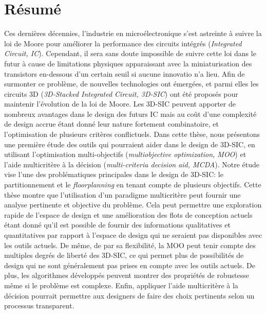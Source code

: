 \chapter[R\'esum\'e (French Summary)]{R\'esum\'e}

\vspace{-0.5in}

Ces dernières décennies, l'industrie en microélectronique s'est astreinte à suivre la loi de Moore pour améliorer la performance des circuits intégrés (\textit{Integrated Circuit, IC}). Cependant, il sera sans doute impossible de suivre cette loi dans le futur à cause de limitations physiques apparaissant avec la miniaturisation des transistors en-dessous d'un certain seuil si aucune innovatio n'a lieu. Afin de surmonter ce problème, de nouvelles technologies ont émergées, et parmi elles les circuits 3D (\textit{3D-Stacked Integrated Circuit, 3D-SIC}) ont été proposés pour maintenir l'évolution de la loi de Moore. Les 3D-SIC peuvent apporter de nombreux avantages dans le design des futurs IC mais au coût d'une complexité de design accrue étant donné leur nature fortement combinatoire, et l'optimisation de plusieurs critères conflictuels. Dans cette thèse, nous présentons une première étude des outils qui pourraient aider dans le design de 3D-SIC, en utilisant l'optimisation multi-objectifs (\textit{multiobjective optimization, MOO}) et l'aide multicritère à la décision (\textit{multi-criteria decision aid, MCDA}). Notre étude vise l'une des problématiques principales dans le design de 3D-SIC: le partitionnement et le \textit{floorplanning} en tenant compte de plusieurs objectifs. Cette thèse montre que l'utilisation d'un paradigme multicritère peut fournir une analyse pertinente et objective du problème. Cela peut permettre une exploration rapide de l'espace de design et une amélioration des flots de conception actuels étant donné qu'il est possible de fournir des informations qualitatives et quantitatives par rapport à l'espace de design qui ne seraient pas disponibles avec les outils actuels. De même, de par sa flexibilité, la MOO peut tenir compte des multiples degrés de liberté des 3D-SIC, ce qui permet plus de possibilités de design qui ne sont généralement pas prises en compte avec les outils actuels. De plus, les algorithmes développés peuvent montrer des propriétés de robustesse même si le problème est complexe. Enfin, appliquer l'aide multicritère à la décision pourrait permettre aux designers de faire des choix pertinents selon un processus transparent.